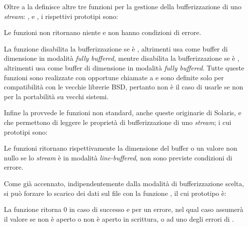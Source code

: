 Oltre a  la  definisce altre tre funzioni per la
gestione della bufferizzazione di uno \textit{stream}: ,
 e , i rispettivi prototipi sono:

\begin{funcproto}{
}

{Le funzioni non ritornano niente e non hanno condizioni di errore.}  
\end{funcproto}


La funzione  disabilita la bufferizzazione se  è
, altrimenti usa  come buffer di dimensione
 in modalità \textit{fully buffered}, mentre 
disabilita la bufferizzazione se  è , altrimenti
usa  come buffer di dimensione  in modalità
\textit{fully buffered}.  Tutte queste funzioni sono realizzate con opportune
chiamate a  e sono definite solo per compatibilità con le
vecchie librerie BSD, pertanto non è il caso di usarle se non per la
portabilità su vecchi sistemi.

Infine la  provvede le funzioni non standard, anche queste
originarie di Solaris,  e  che permettono
di leggere le proprietà di bufferizzazione di uno \textit{stream}; i cui
prototipi sono:

\begin{funcproto}{
}

{Le funzioni ritornano rispettivamente la dimensione del buffer o un valore
  non nullo se lo \textit{stream} è in modalità \textit{line-buffered}, non
  sono previste condizioni di errore.}
\end{funcproto}

Come già accennato, indipendentemente dalla modalità di bufferizzazione
scelta, si può forzare lo scarico dei dati sul file con la funzione
, il cui prototipo è:

\begin{funcproto}{
}

{La funzione ritorna $0$ in caso di successo e  per un errore, nel
  qual caso  assumerà il valore  se 
  non è aperto o non è aperto in scrittura, o ad uno degli errori di
  .}
\end{funcproto}

